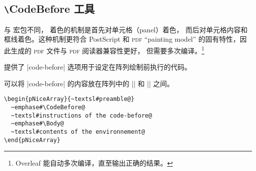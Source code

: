 \documentclass[dvipsnames]{article}%
\begin{document}
\subsection{\texttt{\textbackslash}CodeBefore 工具}
\label{color-in-code-before}
与  宏包不同， 着色的机制是首先对单元格（panel）着色，
而后对单元格内容和框线着色。这种机制更符合 PostScript 和 \textsc{pdf} ``painting model'' 的固有特性，因此生成的 \textsc{pdf} 文件与 \textsc{pdf} 阅读器兼容性更好，
但需要多次编译。\footnote{Overleaf 能自动多次编译，直至输出正确的结果。}


\medskip
{} 提供了 |code-before| 选项用于设定在阵列绘制前执行的代码。


可以将 |code-before| 的内容放在阵列中的 |\CodeBefore| 和 |\Body| 之间。

\bigskip
\begin{Verbatim}
\begin{pNiceArray}{~textsl#preamble@}
  ~emphase#\CodeBefore@
  ~textsl#instructions of the code-before@
  ~emphase#\Body@
  ~textsl#contents of the environnement@
\end{pNiceArray}
\end{Verbatim}
%

\end{document}

